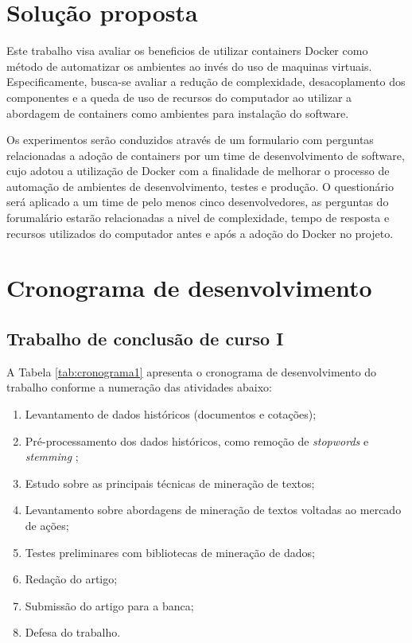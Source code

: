 \documentclass[11pt,a4paper]{article}
\begin{document}
\section{Solução proposta}

Este trabalho visa avaliar os beneficios de utilizar containers Docker como método de automatizar os ambientes
ao invés do uso de maquinas virtuais. Especificamente, busca-se avaliar a redução de complexidade, desacoplamento dos
componentes e a queda de uso de recursos do computador ao utilizar a abordagem de containers como ambientes para instalação
do software.

Os experimentos serão conduzidos através de um formulario com perguntas relacionadas a adoção de containers por um time
de desenvolvimento de software, cujo adotou a utilização de Docker com a finalidade de melhorar o processo de automação
de ambientes de desenvolvimento, testes e produção. O questionário será aplicado a um time de pelo menos cinco desenvolvedores,
as perguntas do forumalário estarão relacionadas a nivel de complexidade, tempo de resposta e recursos utilizados do computador
antes e após a adoção do Docker no projeto.

\section{Cronograma de desenvolvimento}\label{sec:cronograma}

\subsection{Trabalho de conclusão de curso I}

A Tabela \ref{tab:cronograma1} apresenta o cronograma de desenvolvimento do trabalho conforme a numeração das atividades abaixo:
\begin{enumerate}
  \item Levantamento de dados históricos (documentos e cotações);
  \item Pré-processamento dos dados históricos, como remoção de \textit{stopwords} e \textit{stemming} \cite{Weiss:textMining,orengo_stemming};
  \item Estudo sobre as principais técnicas de mineração de textos;
  \item Levantamento sobre abordagens de mineração de textos voltadas ao mercado de ações;
  \item Testes preliminares com bibliotecas de mineração de dados;
  \item Redação do artigo;
  \item Submissão do artigo para a banca;
  \item Defesa do trabalho.
\end{enumerate}
\end{document}
